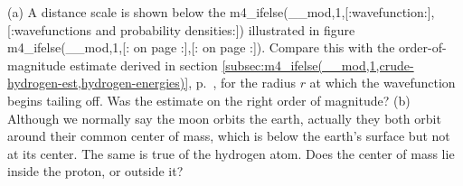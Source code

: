 (a) A distance scale is shown below the
m4_ifelse(__mod,1,[:wavefunction:],[:wavefunctions and probability densities:])
illustrated in figure
m4_ifelse(__mod,1,[: on page \pageref{fig:hydrogen-ground-state-with-scale}:],[: on page \pageref{fig:hydrogen-three-states}:]).
Compare this with the order-of-magnitude estimate derived in section
\ref{subsec:m4_ifelse(__mod,1,crude-hydrogen-est,hydrogen-energies)},
p.~\pageref{subsec:m4_ifelse(__mod,1,crude-hydrogen-est,hydrogen-energies)}, for the radius $r$ at which the wavefunction begins
tailing off. Was the estimate on the right
order of magnitude?\hwendpart
(b) Although we normally say the moon
orbits the earth, actually they both orbit around their
common center of mass, which is below the earth's surface
but not at its center. The same is true of the hydrogen
atom. Does the center of mass lie inside the proton, or outside it?\hwendpart
